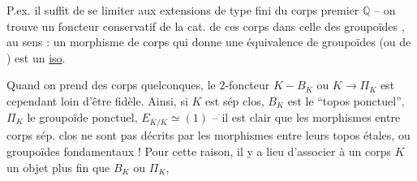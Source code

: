 P.ex. il suffit de se limiter aux extensions de type fini du corps premier $\mathbb{Q}$ -- on trouve un foncteur conservatif de la cat. de ces corps dans celle des groupoïdes , au sens : un morphisme de corps qui donne une équivalence de groupoïdes (ou de ) est un \uline{iso}.


Quand on prend des corps quelconques, le 2-foncteur $K-B_K$ ou $K\longrightarrow\Pi_K$  est cependant loin d'être fidèle. Ainsi, si $K$ est sép clos, $B_K$ est le ``topos ponctuel'', $\Pi_K$ le groupoïde ponctuel, $E_{\bar K/K}\simeq(1)$ -- il est clair que les morphismes entre corps sép. clos ne sont pas décrits par les morphismes entre leurs topos étales, ou groupoïdes fondamentaux ! Pour cette raison, il y a lieu d'associer à un corps $K$ un objet plus fin que $B_K$ ou $\Pi_K$,
